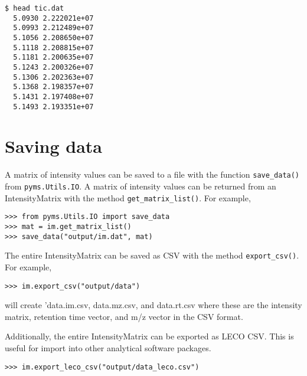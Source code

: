 \begin{verbatim}
$ head tic.dat
  5.0930 2.222021e+07
  5.0993 2.212489e+07
  5.1056 2.208650e+07
  5.1118 2.208815e+07
  5.1181 2.200635e+07
  5.1243 2.200326e+07
  5.1306 2.202363e+07
  5.1368 2.198357e+07
  5.1431 2.197408e+07
  5.1493 2.193351e+07
\end{verbatim}

%

\section{Saving data}

\noindent
A matrix of intensity values can be saved to a file with the function
{\tt save\_data()} from {\tt pyms.Utils.IO}. A matrix of intensity values can
be returned from an IntensityMatrix with the method {\tt get\_matrix\_list()}.
For example,

\begin{verbatim}
>>> from pyms.Utils.IO import save_data
>>> mat = im.get_matrix_list()
>>> save_data("output/im.dat", mat)
\end{verbatim}

The entire IntensityMatrix can be saved as CSV with the method
{\tt export\_csv()}. For example,

\begin{verbatim}
>>> im.export_csv("output/data")
\end{verbatim}

\noindent
will create 'data.im.csv, data.mz.csv, and data.rt.csv where these are the
intensity matrix, retention time vector, and m/z vector in the CSV format.

Additionally, the entire IntensityMatrix can be exported as LECO CSV. This is
 useful for import into other analytical software packages.

\begin{verbatim}
>>> im.export_leco_csv("output/data_leco.csv")
\end{verbatim}
